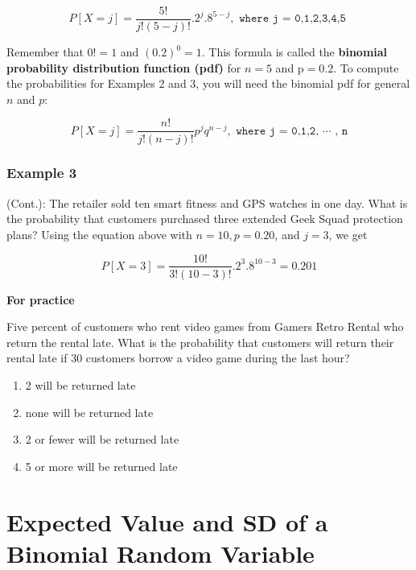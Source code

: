 \documentclass[11pt, chapterprefix=true]{scrbook}\usepackage[]{graphicx}\usepackage[]{color}
\begin{document}
\begin{equation*}
 P[ X = j] = \frac{5!}{j! (5 - j)!} .2^j .8^{5 - j}, \texttt{ where j = 0,1,2,3,4,5 }
 \end{equation*}

Remember that $0! = 1$ and $(0.2)^0 = 1$.  This formula is called the \textbf{binomial probability distribution function (pdf)} for $n = 5$ and p$ = 0.2$.  To compute the probabilities for Examples 2 and 3, you will need the binomial pdf for general $n$ and $p$:

\begin{equation*}
 P[ X = j] = \frac{n!}{j! (n - j)!} p^j q^{n - j}, \texttt{ where j = 0,1,2, $\cdots$ , n}
 \end{equation*}


\subsubsection{Example 3} (Cont.):  The retailer sold ten smart fitness and GPS watches in one day.  What is the probability that customers purchased three extended Geek Squad protection plans?  Using the equation above with $n = 10, p = 0.20$, and $j = 3$, we get

\begin{equation*}
 P[ X = 3] = \frac{10!}{3! (10 - 3)!} .2^3 .8^{10 - 3} = 0.201
 \end{equation*}

\begin{minipage}[ht]{3cm}

\textbf{For practice}
\end{minipage}
\begin{minipage}[ht]{12cm}

Five percent of customers who rent video games from Gamers Retro Rental who return the rental late.  What is the probability that customers will return their rental late if 30 customers borrow a video game during the last hour?

\begin{enumerate}
\item 2 will be returned late
\item none will be returned late
\item 2 or fewer will be returned late
\item 5 or more will be returned late
\end{enumerate}
\end{minipage}

\section{Expected Value and SD of a Binomial Random Variable}
\end{document}
